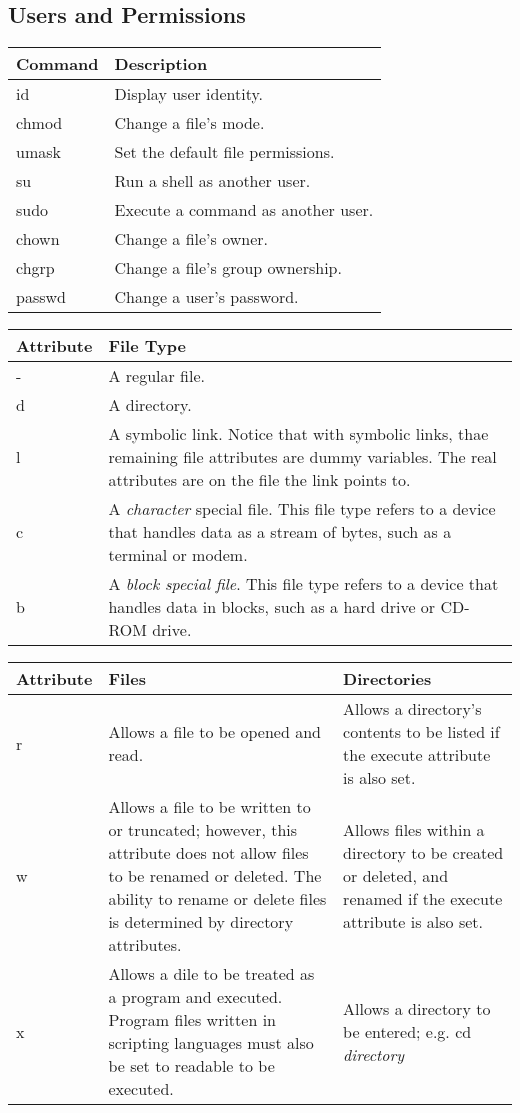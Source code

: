 \documentclass[12pt]{article}
\begin{document}
\subsection{Users and Permissions}%
\noindent\begin{tabular}{| l | l |}
	\hline
	Command & Description\\ \hline
	id & Display user identity.\\
	chmod & Change a file's mode.\\
	umask & Set the default file permissions.\\
	su & Run a shell as another user.\\
	sudo & Execute a command as another user.\\
	chown & Change a file's owner.\\
	chgrp & Change a file's group ownership.\\
	passwd & Change a user's password.\\
	\hline
\end{tabular}	

\vskip 0.15in
\noindent \begin{tabular}{|l|p{4in}|}
	\hline
	Attribute & File Type\\ \hline
	- & A regular file.\\
	d & A directory.\\
	l & A symbolic link. Notice that with symbolic links, thae remaining file attributes are dummy variables. The real attributes are on the file the link points to.\\
	c & A \textit{character} special file. This file type refers to a device that handles data as a stream of bytes, such as a terminal or modem.\\
	b & A \textit{block special file}. This file type refers to a device that handles data in blocks, such as a hard drive or CD-ROM drive.\\
	\hline
\end{tabular}

\vskip 0.08in
\noindent \begin{tabular}{|l|p{3in}|p{3in}|}
	\hline
	Attribute & Files & Directories\\ \hline
	r & Allows a file to be opened and read. & Allows a directory's contents to be listed if the execute attribute is also set.\\
	w & Allows a file to be written to or truncated; however, this attribute does not allow files to be renamed or deleted. The ability to rename or delete files is determined by directory attributes. & Allows files within a directory to be created or deleted, and renamed if the execute attribute is also set.\\
	x & Allows a  dile to be treated as a program and executed. Program files written in scripting languages must also be set to readable to be executed. & Allows a directory  to be entered; e.g. cd \textit{directory}\\
	\hline
\end{tabular}
\end{document}
